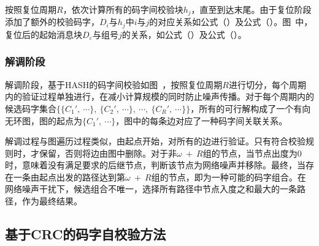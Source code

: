 按照复位周期$R$，依次计算所有的码字间校验块$h_{j}$，直至到达末尾。由于复位阶段添加了额外的校验码字，$D_{i}$与$h_{j}$中$i$与$j$的对应关系如公式（）及公式（）。图\ 中，复位后的起始消息块$D_{\varepsilon}$与组号$j$的关系，如公式（）及公式（）。

\subsubsection{解调阶段}
\label{chap:hash:robustness:hash:demodulation}


解调阶段，基于HASH的码字间校验如图\ ，按照复位周期$R$进行切分，每个周期内的验证过程单独进行，在减小计算规模的同时防止噪声传播。对于每个周期内的候选码字集合$\{\{C_{1}',\ \cdots\},\ \{C_{2}',\ \cdots \},\ \cdots ,\ \{C_{R}',\ \cdots\}\}$，所有的可行解构成了一个有向无环图，图的起点为$\{C_{1}',\ \cdots \}$，图中的每条边对应了一种码字间关联关系。

解调过程与图遍历过程类似，由起点开始，对所有的边进行验证。只有符合校验规则时，才保留，否则将边由图中删除。对于非$\omega\ +\ R$组的节点，当节点出度为0时，意味着没有满足要求的后继节点，判断该节点为网络噪声并移除。最终，当存在一条由起点出发的路径达到第$\omega\ +\ R$组的节点，即为一种可能的码字组合。在网络噪声干扰下，候选组合不唯一，选择所有路径中节点入度之和最大的一条路径，作为最终结果。

\subsection{基于CRC的码字自校验方法}
\label{chap:hash:robustness:crc}

